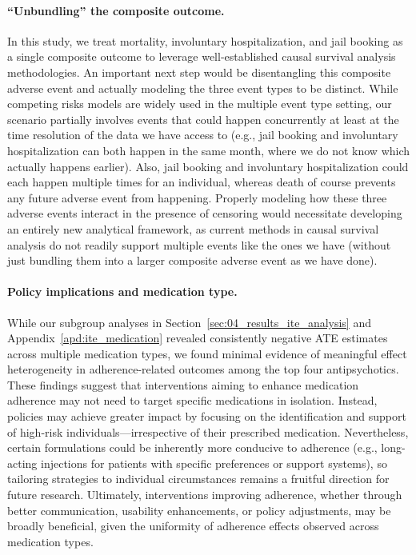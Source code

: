 \vspace{-.25em}
\paragraph{``Unbundling'' the composite outcome.}
In this study, we treat mortality, involuntary hospitalization, and jail booking as a single composite outcome to leverage well-established causal survival analysis methodologies.
An important next step would be disentangling this composite adverse event and actually modeling the three event types to be distinct.
While competing risks models are widely used in the multiple event type setting, our scenario partially involves events that could happen concurrently at least at the time resolution of the data we have access to (e.g., jail booking and involuntary hospitalization can both happen in the same month, where we do not know which actually happens earlier). 
Also, jail booking and involuntary hospitalization could each happen multiple times for an individual, whereas death of course prevents any future adverse event from happening.
Properly modeling how these three adverse events interact in the presence of censoring would necessitate developing an entirely new analytical framework, as current methods in causal survival analysis do not readily support multiple events like the ones we have (without just bundling them into a larger composite adverse event as we have done).

\vspace{-.25em}
\paragraph{Policy implications and medication type.}
While our subgroup analyses in Section~\ref{sec:04_results_ite_analysis} and Appendix~\ref{apd:ite_medication} revealed consistently negative ATE estimates across multiple medication types, we found minimal evidence of meaningful effect heterogeneity in adherence-related outcomes among the top four antipsychotics.
These findings suggest that interventions aiming to enhance medication adherence may not need to target specific medications in isolation.
Instead, policies may achieve greater impact by focusing on the identification and support of high-risk individuals—irrespective of their prescribed medication.
Nevertheless, certain formulations could be inherently more conducive to adherence (e.g., long-acting injections for patients with specific preferences or support systems), so tailoring strategies to individual circumstances remains a fruitful direction for future research.
Ultimately, interventions improving adherence, whether through better communication, usability enhancements, or policy adjustments, may be broadly beneficial, given the uniformity of adherence effects observed across medication types.

